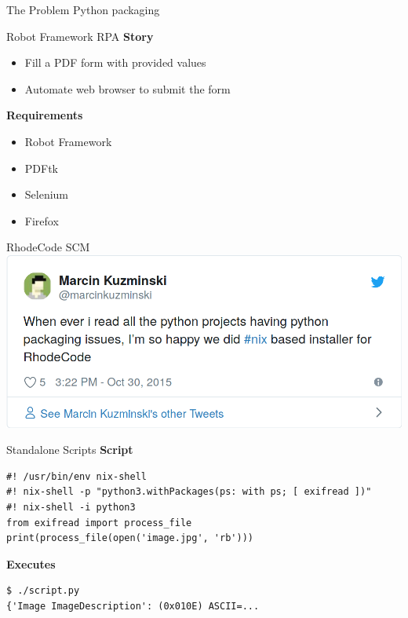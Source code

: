 \documentclass[10pt,aspectratio=169]{beamer}
\begin{document}

\begin{frame}{The Problem}
  \center\Huge
  Python packaging 
\end{frame}


\begin{frame}{Robot Framework RPA}
  \textbf{Story}
  \begin{itemize}
    \item Fill a PDF form with provided values
    \item Automate web browser to submit the form
  \end{itemize}
  \textbf{Requirements}
  \begin{itemize}
    \item Robot Framework
    \item PDFtk
    \item Selenium
    \item Firefox
  \end{itemize}
\end{frame}


\begin{frame}{RhodeCode SCM}
\includegraphics[width=0.70\paperwidth]{images/rhodecode-tweet.png}
\end{frame}


\begin{frame}[fragile]{Standalone Scripts}
  \textbf{Script}
  \begin{verbatim}
#! /usr/bin/env nix-shell
#! nix-shell -p "python3.withPackages(ps: with ps; [ exifread ])"
#! nix-shell -i python3
from exifread import process_file
print(process_file(open('image.jpg', 'rb')))
  \end{verbatim}
  \textbf{Executes}
  \begin{verbatim}
$ ./script.py
{'Image ImageDescription': (0x010E) ASCII=...
  \end{verbatim}
\end{frame}
\end{document}
